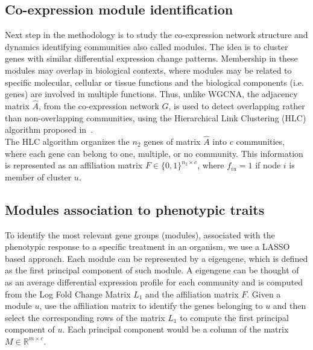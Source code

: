\documentclass[12pt,journal, onecolumn]{IEEEtran}
\begin{document}
\subsection{Co-expression module identification}

Next step in the methodology is to study the co-expression network structure and dynamics identifying communities also called modules. The idea is to cluster genes with similar differential expression change patterns. Membership in these modules may overlap in biological contexts, where modules may be related to specific molecular, cellular or tissue functions and the biological components (i.e. genes) are involved in multiple functions. Thus, unlike WGCNA, the adjacency matrix $\hat{A}$, from the co-expression network $G$, is used to detect overlapping rather than non-overlapping communities, using the Hierarchical Link Clustering (HLC) algorithm proposed in~\cite{ahn2010link}.\\


The HLC algorithm organizes the $n_2$ genes of matrix $\hat{A}$ into $c$ communities, where each gene can belong to one, multiple, or no community. This information is represented as an affiliation matrix $F \in \{0,1\}^{n_2 \times c}$, where $f_{iu} = 1$ if node $i$ is member of cluster $u$.\\ 

\subsection{Modules association to phenotypic traits}

To identify the most relevant gene groups (modules), associated with the phenotypic response to a specific treatment in an organism, we use a LASSO based approach. Each module can be represented by a eigengene, which is defined as the first principal component of such module. A eigengene can be thought of as an average differential expression profile for each community and is computed from the Log Fold Change Matrix $L_1$ and the affiliation matrix $F$. Given a module $u$, use the affiliation matrix to identify the genes belonging to $u$ and then select the corresponding rows of the matrix $L_1$ to compute the first principal component of $u$. Each principal component would be a column of the matrix $M \in \mathbb{R}^{m \times c}$.\\   
\end{document}
